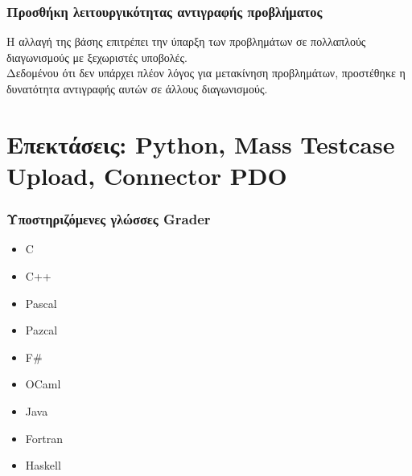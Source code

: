 \documentclass{beamer}
\begin{document}
\begin{frame}
  \frametitle{Προσθήκη λειτουργικότητας αντιγραφής προβλήματος}

  Η αλλαγή της βάσης επιτρέπει την ύπαρξη των προβλημάτων σε πολλαπλούς διαγωνισμούς
  με ξεχωριστές υποβολές. \\[0.3cm]

  Δεδομένου ότι δεν υπάρχει πλέον λόγος για μετακίνηση προβλημάτων, προστέθηκε η
  δυνατότητα αντιγραφής αυτών σε άλλους διαγωνισμούς.
\end{frame}

\section{Επεκτάσεις: Python, Mass Testcase Upload, Connector PDO}

\begin{frame}
  \frametitle{Υποστηριζόμενες γλώσσες Grader}
  \begin{itemize}
      \setlength\itemsep{0em}
      \item C
      \item C++
      \item Pascal
      \item Pazcal
      \item F\#
      \item OCaml
      \item Java
      \item Fortran
      \item Haskell
  \end{itemize}
\end{frame}
\end{document}
